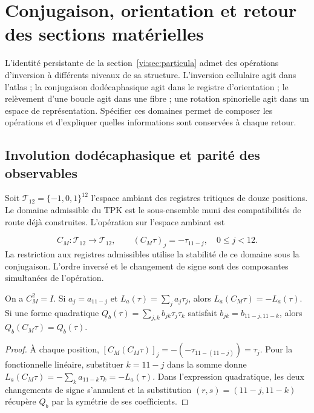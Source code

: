 \section{Conjugaison, orientation et retour des sections matérielles
}
\label{vi:sec:conjugacion}

L’identité persistante de la section~\ref{vi:sec:particula} admet
des opérations d’inversion à différents niveaux de sa structure.
L’inversion cellulaire agit dans l’atlas ; la conjugaison dodécaphasique
agit dans le registre d’orientation ; le relèvement d’une boucle agit
dans une fibre ; une rotation spinorielle agit dans un espace de
représentation. Spécifier ces domaines permet de composer les
opérations et d’expliquer quelles informations sont conservées à chaque retour.


\subsection{Involution dodécaphasique et parité des observables
}
\label{vi:subsec:conjugacion-registro}

Soit $\mathcal T_{12}=\{-1,0,1\}^{12}$ l’espace ambiant des registres
tritiques de douze positions. Le domaine admissible du TPK est le
sous-ensemble muni des compatibilités de route déjà construites. L’opération
sur l’espace ambiant est

\begin{equation}
 C_M:\mathcal T_{12}\longrightarrow\mathcal T_{12},\qquad
 (C_M\tau)_j=-\tau_{11-j},\quad 0\leq j<12.
 \label{vi:eq:cm}
\end{equation}
La restriction aux registres admissibles utilise la stabilité de ce
domaine sous la conjugaison. L’ordre inversé et le changement de signe
sont des composantes simultanées de l’opération.


\begin{proposition}
\label{vi:prop:paridad-registro}
On a $C_M^2=I$. Si $a_j=a_{11-j}$ et
$L_a(\tau)=\sum_ja_j\tau_j$, alors
$L_a(C_M\tau)=-L_a(\tau)$. Si une forme quadratique
$Q_b(\tau)=\sum_{j,k}b_{jk}\tau_j\tau_k$ satisfait
$b_{jk}=b_{11-j,11-k}$, alors $Q_b(C_M\tau)=Q_b(\tau)$.

\end{proposition}
\begin{proof}
À chaque position,
$[C_M(C_M\tau)]_j=-(-\tau_{11-(11-j)})=\tau_j$.
Pour la fonctionnelle linéaire, substituer $k=11-j$ dans la somme donne
$L_a(C_M\tau)=-\sum_ka_{11-k}\tau_k=-L_a(\tau)$.
Dans l’expression quadratique, les deux changements de signe s’annulent et
la substitution $(r,s)=(11-j,11-k)$ récupère $Q_b$ par la
symétrie de ses coefficients.

\end{proof}

